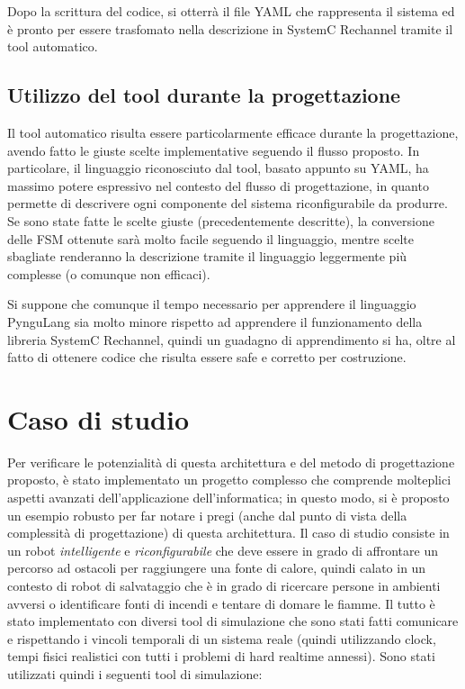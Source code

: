\documentclass[a4paper,titlepage]{book}
\begin{document}
Dopo la scrittura del codice, si otterrà il file YAML che rappresenta il sistema ed è pronto per essere trasfomato nella descrizione in SystemC Rechannel tramite il tool automatico.


\section{Utilizzo del tool durante la progettazione}

Il tool automatico risulta essere particolarmente efficace durante la progettazione, avendo fatto le giuste scelte implementative seguendo il flusso proposto. In particolare, il linguaggio riconosciuto dal tool, basato appunto su YAML, ha massimo potere espressivo nel contesto del flusso di progettazione, in quanto permette di descrivere ogni componente del sistema riconfigurabile da produrre. Se sono state fatte le scelte giuste (precedentemente descritte), la conversione delle FSM ottenute sarà molto facile seguendo il linguaggio, mentre scelte sbagliate renderanno la descrizione tramite il linguaggio leggermente più complesse (o comunque non efficaci).

Si suppone che comunque il tempo necessario per apprendere il linguaggio PynguLang sia molto minore rispetto ad apprendere il funzionamento della libreria SystemC Rechannel, quindi un guadagno di apprendimento si ha, oltre al fatto di ottenere codice che risulta essere safe e corretto per costruzione.



\chapter{Caso di studio}

Per verificare le potenzialità di questa architettura e del metodo di progettazione proposto, è stato implementato un progetto complesso che comprende molteplici aspetti avanzati dell'applicazione dell'informatica; in questo modo, si è proposto un esempio robusto per far notare i pregi (anche dal punto di vista della complessità di progettazione) di questa architettura.
Il caso di studio consiste in un robot \textit{intelligente} e \textit{riconfigurabile} che deve essere in grado di affrontare un percorso ad ostacoli per raggiungere una fonte di calore, quindi calato in un contesto di robot di salvataggio che è in grado di ricercare persone in ambienti avversi o identificare fonti di incendi e tentare di domare le fiamme. Il tutto è stato implementato con diversi tool di simulazione che sono stati fatti comunicare e rispettando i vincoli temporali di un sistema reale (quindi utilizzando clock, tempi fisici realistici con tutti i problemi di hard realtime annessi).
Sono stati utilizzati quindi i seguenti tool di simulazione:
\end{document}
